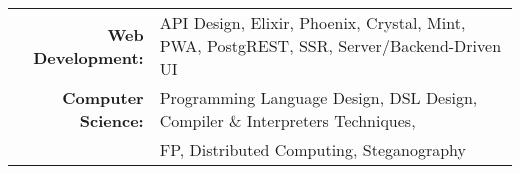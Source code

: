 
\vspace{1em}
\begin{tabular}{rl}

    \textbf{Web Development:} & API Design, Elixir, Phoenix, Crystal, Mint, PWA, PostgREST, SSR, Server/Backend-Driven UI \\
    \textbf{Computer Science:} & Programming Language Design, DSL Design, Compiler \& Interpreters Techniques,\\
                               & FP, Distributed Computing, Steganography \\

\end{tabular}
